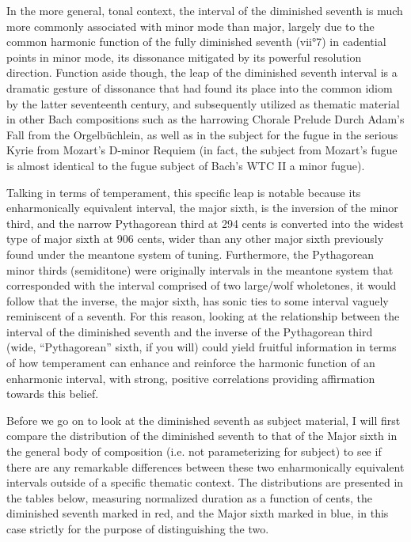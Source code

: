 In the more general, tonal context, the interval of the diminished
seventh is much more commonly associated with minor mode than major,
largely due to the common harmonic function of the fully diminished
seventh (vii°7) in cadential points in minor mode, its dissonance
mitigated by its powerful resolution direction. Function aside though,
the leap of the diminished seventh interval is a dramatic gesture of
dissonance that had found its place into the common idiom by the latter
seventeenth century, and subsequently utilized as thematic material in
other Bach compositions such as the harrowing Chorale Prelude Durch
Adam's Fall from the Orgelbüchlein, as well as in the subject for the
fugue in the serious Kyrie from Mozart's D-minor Requiem (in fact, the
subject from Mozart's fugue is almost identical to the fugue subject of
Bach's WTC II a minor fugue).

Talking in terms of temperament, this specific leap is notable because
its enharmonically equivalent interval, the major sixth, is the
inversion of the minor third, and the narrow Pythagorean third at 294
cents is converted into the widest type of major sixth at 906 cents,
wider than any other major sixth previously found under the meantone
system of tuning. Furthermore, the Pythagorean minor thirds (semiditone)
were originally intervals in the meantone system that corresponded with
the interval comprised of two large/wolf wholetones, it would follow
that the inverse, the major sixth, has sonic ties to some interval
vaguely reminiscent of a seventh. For this reason, looking at the
relationship between the interval of the diminished seventh and the
inverse of the Pythagorean third (wide, ``Pythagorean'' sixth, if you
will) could yield fruitful information in terms of how temperament can
enhance and reinforce the harmonic function of an enharmonic interval,
with strong, positive correlations providing affirmation towards this
belief.

Before we go on to look at the diminished seventh as subject material, I
will first compare the distribution of the diminished seventh to that of
the Major sixth in the general body of composition (i.e. not
parameterizing for subject) to see if there are any remarkable
differences between these two enharmonically equivalent intervals
outside of a specific thematic context. The distributions are presented
in the tables below, measuring normalized duration as a function of
cents, the diminished seventh marked in red, and the Major sixth marked
in blue, in this case strictly for the purpose of distinguishing the
two.



